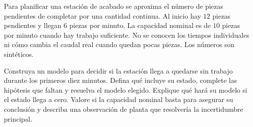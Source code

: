 Para planificar una estación de acabado se aproxima el número de piezas pendientes de completar por una cantidad continua. Al inicio hay \(12\) piezas pendientes y llegan \(6\) piezas por minuto. La capacidad nominal es de \(10\) piezas por minuto cuando hay trabajo suficiente. No se conocen los tiempos individuales ni cómo cambia el caudal real cuando quedan pocas piezas. Los números son sintéticos.

Construya un modelo para decidir si la estación llega a quedarse sin trabajo durante los primeros diez minutos. Defina qué incluye su estado, complete las hipótesis que faltan y resuelva el modelo elegido. Explique qué hará su modelo si el estado llega a cero. Valore si la capacidad nominal basta para asegurar su conclusión y describa una observación de planta que resolvería la incertidumbre principal.
